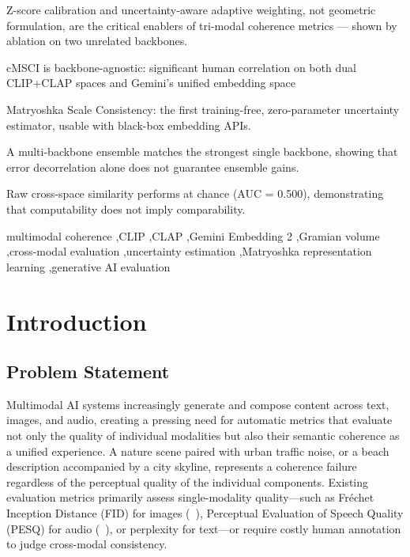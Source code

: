\documentclass[a4paper,fleqn]{cas-sc}
\begin{document}
\begin{highlights}
\item Z-score calibration and uncertainty-aware adaptive weighting, not geometric formulation, are the critical enablers of tri-modal coherence metrics — shown by ablation on two unrelated backbones.
\item cMSCI is backbone-agnostic: significant human correlation on both dual CLIP+CLAP spaces and Gemini’s unified embedding space
\item Matryoshka Scale Consistency: the first training-free, zero-parameter uncertainty estimator, usable with black-box embedding APIs.
\item A multi-backbone ensemble matches the strongest single backbone, showing that error decorrelation alone does not guarantee ensemble gains.
\item Raw cross-space similarity performs at chance (AUC = 0.500), demonstrating that computability does not imply comparability.
\end{highlights}


\begin{keywords}
multimodal coherence \sep CLIP \sep CLAP \sep Gemini Embedding 2 \sep Gramian volume \sep cross-modal evaluation \sep uncertainty estimation \sep Matryoshka representation learning \sep generative AI evaluation
\end{keywords}




\maketitle

\section{Introduction}\label{sec:introduction}

\subsection{Problem Statement}
Multimodal AI systems increasingly generate and compose content across text, images, and audio, creating a pressing need for automatic metrics that evaluate not only the quality of individual modalities but also their semantic coherence as a unified experience. A nature scene paired with urban traffic noise, or a beach description accompanied by a city skyline, represents a coherence failure regardless of the perceptual quality of the individual components. Existing evaluation metrics primarily assess single-modality quality---such as Fr\'echet Inception Distance (FID) for images (~\cite{heusel2017fid}), Perceptual Evaluation of Speech Quality (PESQ) for audio (~\cite{rix2001pesq}), or perplexity for text---or require costly human annotation to judge cross-modal consistency.
\end{document}

